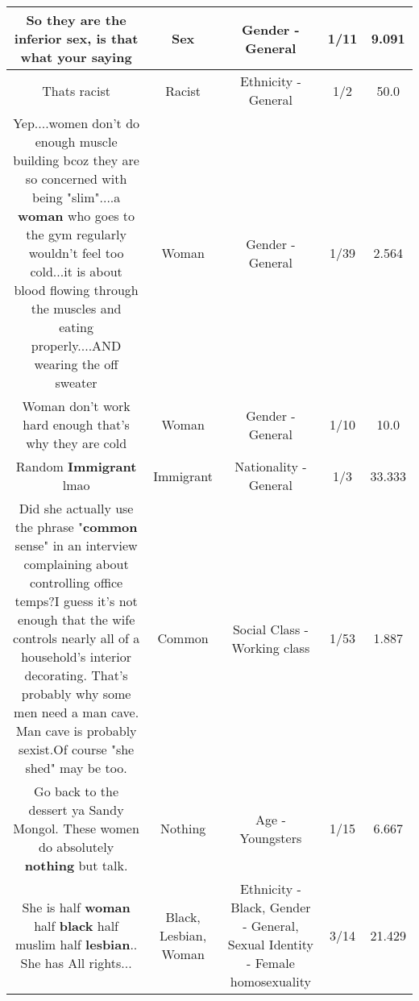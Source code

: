 \documentclass[11pt]{article}
\newlength\mylength
\begin{document}
\begin{center}
\begin{longtable}{|C{.65\mylength}|C{.30\mylength}|C{.12\mylength}|C{.12\mylength}|C{.12\mylength}|}
  \small So they are the inferior \textbf{sex}, is that what your saying\normalsize   & Sex & Gender - General & 1/11 & 9.091 \\  \hline
  \small Thats racist\normalsize   & Racist & Ethnicity - General & 1/2 & 50.0 \\  \hline
  \small Yep....women don't do enough muscle building bcoz they are so concerned with being "slim"....a \textbf{woman} who goes to the gym regularly wouldn't feel too cold...it is about blood flowing through the muscles and eating properly....AND wearing the off sweater\normalsize   & Woman & Gender - General & 1/39 & 2.564 \\  \hline
  \small Woman don't work hard enough that's why they are cold\normalsize   & Woman & Gender - General & 1/10 & 10.0 \\  \hline
  \small Random \textbf{Immigrant} lmao\normalsize   & Immigrant & Nationality - General & 1/3 & 33.333 \\  \hline
  \small Did she actually use the phrase "\textbf{common} sense" in an interview complaining about controlling office temps?I guess it's not enough that the wife controls nearly all of a household's interior decorating. That's probably why some men need a man cave. Man cave is probably sexist.Of course "she shed" may be too.\normalsize   & Common & Social Class - Working class & 1/53 & 1.887 \\  \hline
  \small Go back to the dessert ya Sandy Mongol. These women do absolutely \textbf{nothing} but talk.\normalsize   & Nothing & Age - Youngsters & 1/15 & 6.667 \\  \hline
  \small She is half \textbf{woman} half \textbf{black} half muslim half \textbf{lesbian}..  She has All rights...\normalsize   & Black, Lesbian, Woman & Ethnicity - Black, Gender - General, Sexual Identity - Female homosexuality & 3/14 & 21.429 \\  \hline

\end{longtable}
\end{center}
\end{document}
